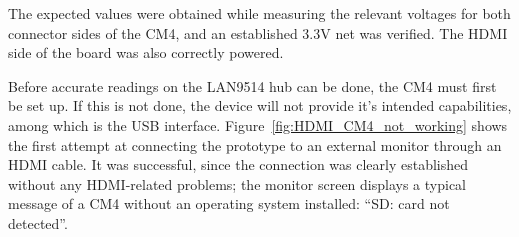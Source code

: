 \begingroup
\begin{table}[h]
	\caption{CM4 high-speed circuit's most relevant voltages expected and measured, for all operational modes, with the CM4 mounted on the prototype.}
	\label{tab:CM4_HighSpeed_3_modes_WITH_CM4}
	\centering
\end{table}
\endgroup%

The expected values were obtained while measuring the relevant voltages for both connector sides of the CM4, and an established 3.3V net was verified. The HDMI side of the board was also correctly powered.

Before accurate readings on the LAN9514 hub can be done, the CM4 must first be set up. If this is not done, the device will not provide it's intended capabilities, among which is the USB interface. Figure~\ref{fig:HDMI_CM4_not_working} shows the first attempt at connecting the prototype to an external monitor through an HDMI cable. It was successful, since the connection was clearly established without any HDMI-related problems; the monitor screen displays a typical message of a CM4 without an operating system installed: ``SD: card not detected''.


